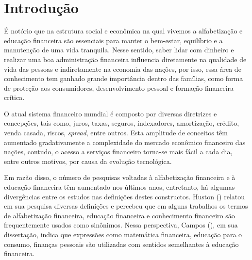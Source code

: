 




\textual
\chapter{Introdução}
É notório que na estrutura social e econômica na qual vivemos a alfabetização e educação financeira são essenciais para manter o bem-estar, equilíbrio e a manutenção de uma vida tranquila. Nesse sentido, saber lidar com dinheiro e realizar uma boa administração financeira influencia diretamente na qualidade de vida das pessoas e indiretamente na economia das nações, por isso, essa área de conhecimento tem ganhado grande importância dentro das famílias, como forma de proteção aos consumidores, desenvolvimento pessoal e formação financeira crítica.

O atual sistema financeiro mundial é composto por diversas diretrizes e concepções, tais como, juros, taxas, seguros, indexadores, amortização, crédito, venda casada, riscos, \textit{spread}, entre outros. Esta amplitude de conceitos têm aumentado gradativamente a complexidade do mercado econômico financeiro das nações, contudo, o acesso a serviços financeiro torna-se mais fácil a cada dia, entre outros motivos, por causa da evolução tecnológica.

Em razão disso, o número de pesquisas voltadas à alfabetização financeira e à educação financeira têm aumentado nos últimos anos, entretanto, há algumas divergências entre os estudos nas definições destes constructos. Huston (\citeyear{huston2010}) relatou em sua pesquisa diversas definições e percebeu que em alguns trabalhos os termos de alfabetização financeira, educação financeira e conhecimento financeiro são frequentemente usados como sinônimos. Nessa perspectiva, Campos (\citeyear{campos2013}), em sua dissertação, indica que expressões como matemática financeira, educação para o consumo, finanças pessoais são utilizadas com sentidos semelhantes à educação financeira.

